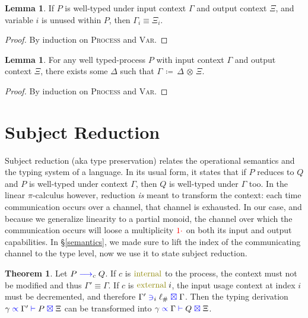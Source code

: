 \documentclass[a4paper,UKenglish,cleveref, autoref, thm-restate,authorcolumns]{lipics-v2019}
\theoremstyle{definition}
\newtheorem{nitheorem}[theorem]{Theorem}
\newtheorem{nilemma}[theorem]{Lemma}
\newcommand{\picalc}{$\pi$-calculus}
\newcommand{\type}[1]{\textcolor{blue}{\operatorname{#1}}}
\newcommand{\constr}[1]{\textcolor{olive}{\operatorname{#1}}}
\newcommand{\field}[1]{\textcolor{red}{\operatorname{#1}}}
\newcommand{\opctx}[3]{#1 \, \coloneqq \, #2 \, \otimes \, #3}
\newcommand{\one}{\field{1\cdot}}
\newcommand{\reduce}[1]{\; \type{\longrightarrow}_{#1} \;}
\newcommand{\types}[4]{#1 \; \type{\propto} \; #2 \; \type{\vdash} \; #3 \; \type{\boxtimes} \; #4}
\newcommand{\containsusage}[4]{#1 \; \type{\ni}_{#2} \; #3 \; \type{\boxtimes} \; #4}
\begin{document}
\begin{nilemma}
  \label{lm:types-unused}
  If $P$ is well-typed under input context $\Gamma$ and output context $\Xi$, and variable $i$ is unused within $P$, then $\Gamma_i \equiv \Xi_i$.
\end{nilemma}
\begin{proof}
  By induction on \textsc{Process} and \textsc{Var}.
\end{proof}

\begin{nilemma}
  \label{lm:types-op}
  For any well typed-process $P$ with input context $\Gamma$ and output context $\Xi$, there exists some $\Delta$ such that $\opctx{\Gamma}{\Delta}{\Xi}$.
\end{nilemma}
\begin{proof}
  By induction on \textsc{Process} and \textsc{Var}.
\end{proof}

\section{Subject Reduction}
\label{subject-reduction}

Subject reduction (aka type preservation) relates the operational semantics and the typing system of a language.
In its usual form, it states that if $P$ reduces to $Q$ and $P$ is well-typed under context $\Gamma$, then $Q$ is well-typed under $\Gamma$ too.
In the linear \picalc{} however, reduction \emph{is} meant to transform the context: each time communication occurs over a channel, that channel is exhausted.
In our case, and because we generalize linearity to a partial monoid, the channel over which the communication occurs will loose a multiplicity $\one$ on both its input and output capabilities.
In \S \ref{semantics}, we made sure to lift the index of the communicating channel to the type level, now we use it to state subject reduction.

\begin{nitheorem}
  Let $P \reduce{c} Q$.
  If $c$ is $\constr{internal}$ to the process, the context must not be modified and thus $\Gamma' \equiv \Gamma$.
  If $c$ is $\constr{external}\; i$, the input usage context at index $i$ must be decremented, and therefore $\containsusage{\Gamma'}{i}{\ell_\#}{\Gamma}$.
  Then the typing derivation $\types{\gamma}{\Gamma'}{P}{\Xi}$ can be transformed into $\types{\gamma}{\Gamma}{Q}{\Xi}$.
\end{nitheorem}
\end{document}
